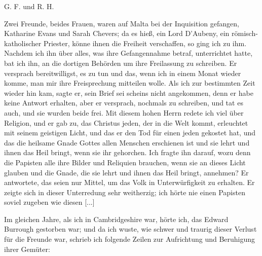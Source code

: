 {  \medskip 

  \begin{flushright}G. F. und R. H.\end{flushright}

}

Zwei Freunde, beides Frauen, waren auf Malta bei der
Inquisition gefangen, Katharine Evans 
und Sarah Chevers; da
es hieß, ein Lord D'Aubeny, 
ein römisch-katholischer Priester,
könne ihnen die Freiheit verschaffen, so ging ich zu ihm. Nachdem 
ich ihn über alles, was ihre Gefangennahme betraf, unterrichtet 
hatte, bat ich ihn, an die dortigen Behörden um ihre
Freilassung zu schreiben. Er versprach bereitwilligst, es zu tun
und das, wenn ich in einem Monat wieder komme, man mir
ihre Freisprechung mitteilen wolle. Als ich zur bestimmten Zeit
wieder hin kam, sagte er, sein Brief sei scheins nicht angekommen,
denn er habe keine Antwort erhalten, aber er versprach, nochmals
zu schreiben, und tat es auch, und sie wurden beide frei.
Mit diesem hohen Herrn redete ich viel über Religion, und
er gab zu, das Christus jeden, der in die Welt kommt, erleuchtet
mit seinem geistigen Licht, und das er den Tod für einen jeden
gekostet hat, und das die heilsame Gnade Gottes allen Menschen
erschienen ist und sie lehrt und ihnen das Heil bringt, wenn sie
ihr gehorchen. Ich fragte ihn darauf, wozu denn die Papisten
alle ihre Bilder und Reliquien brauchen, wenn sie an dieses Licht
glauben und die Gnade, die sie lehrt und ihnen das Heil bringt,
annehmen? Er antwortete, das seien nur Mittel, um das
Volk in Unterwürfigkeit zu erhalten. Er zeigte sich in dieser
Unterredung sehr weitherzig; ich hörte nie einen Papisten soviel
zugeben wie diesen [...]

Im gleichen Jahre, als ich in Cambridgeshire war, hörte ich,
das Edward Burrough gestorben war; und da ich wuste, wie
schwer und traurig dieser Verlust für die Freunde war, schrieb
ich folgende Zeilen zur Aufrichtung und Beruhigung ihrer Gemüter:



